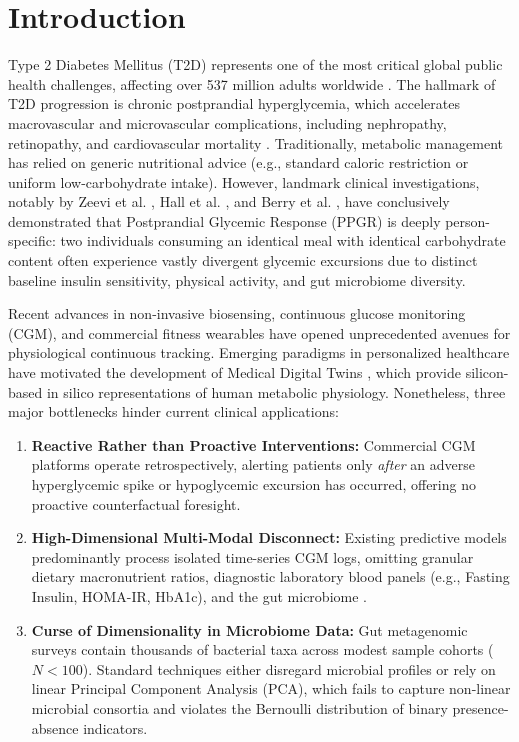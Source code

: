 \documentclass[conference]{IEEEtran}
\begin{document}
\section{Introduction}
Type 2 Diabetes Mellitus (T2D) represents one of the most critical global public health challenges, affecting over 537 million adults worldwide \cite{idf2021}. The hallmark of T2D progression is chronic postprandial hyperglycemia, which accelerates macrovascular and microvascular complications, including nephropathy, retinopathy, and cardiovascular mortality \cite{brownlee2005pathobiology}. Traditionally, metabolic management has relied on generic nutritional advice (e.g., standard caloric restriction or uniform low-carbohydrate intake). However, landmark clinical investigations, notably by Zeevi et al. \cite{zeevi2015personalized}, Hall et al. \cite{hall2018glucotypes}, and Berry et al. \cite{berry2020human}, have conclusively demonstrated that Postprandial Glycemic Response (PPGR) is deeply person-specific: two individuals consuming an identical meal with identical carbohydrate content often experience vastly divergent glycemic excursions due to distinct baseline insulin sensitivity, physical activity, and gut microbiome diversity.

Recent advances in non-invasive biosensing, continuous glucose monitoring (CGM), and commercial fitness wearables have opened unprecedented avenues for physiological continuous tracking. Emerging paradigms in personalized healthcare have motivated the development of Medical Digital Twins \cite{shamanna2020twin, voigt2021digital}, which provide silicon-based in silico representations of human metabolic physiology. Nonetheless, three major bottlenecks hinder current clinical applications:
\begin{enumerate}
    \item \textbf{Reactive Rather than Proactive Interventions:} Commercial CGM platforms operate retrospectively, alerting patients only \emph{after} an adverse hyperglycemic spike or hypoglycemic excursion has occurred, offering no proactive counterfactual foresight.
    \item \textbf{High-Dimensional Multi-Modal Disconnect:} Existing predictive models predominantly process isolated time-series CGM logs, omitting granular dietary macronutrient ratios, diagnostic laboratory blood panels (e.g., Fasting Insulin, HOMA-IR, HbA1c), and the gut microbiome \cite{mendes2024cgmacros}.
    \item \textbf{Curse of Dimensionality in Microbiome Data:} Gut metagenomic surveys contain thousands of bacterial taxa across modest sample cohorts ($N < 100$). Standard techniques either disregard microbial profiles or rely on linear Principal Component Analysis (PCA), which fails to capture non-linear microbial consortia and violates the Bernoulli distribution of binary presence-absence indicators.
\end{enumerate}
\end{document}
